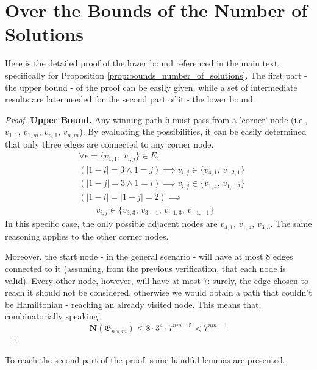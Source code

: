 \documentclass[conference]{IEEEtran}
\begin{document}



\newpage
\appendices
\section{Over the Bounds of the Number of Solutions} 	\label{appendix:proof_bound}
Here is the detailed proof of the lower bound referenced in the main text, specifically for Proposition \ref{prop:bounds_number_of_solutions}.
The first part - the upper bound - of the proof can be easily given, while a set of intermediate results are later needed for the second part of it - the lower bound.
\vspace{0.6em}
\begin{proof}
	\textbf{Upper Bound.} 
	Any winning path $\mathfrak{h}$ must pass from a 'corner' node (i.e., $v_{1,1},\,v_{1,m},\,v_{n,1},\,v_{n,m}$). By evaluating the possibilities, it can be easily determined that only three edges are connected to any corner node.
	\begin{align*}
		&\forall e = \{v_{1,1},\;v_{i,j}\} \in E, \\
		&(|1 - i| = 3 \land 1 = j) \implies v_{i,j} \in \{v_{4,1},\,v_{-2,1}\} \\
		&(|1 - j| = 3 \land 1 = i) \implies v_{i,j} \in \{v_{1,4},\,v_{1,-2}\} \\
		&(|1 - i| = |1 - j| = 2) \implies \\
		&\quad\quad v_{i,j} \in \{v_{3,3},\,v_{3,-1},\,v_{-1,3},\,v_{-1,-1}\}
	\end{align*}
	In this specific case, the only possible adjacent nodes are $v_{4,1},\,v_{1,4},\,v_{3,3}$. The same reasoning applies to the other corner nodes.
	
	Moreover, the start node - in the general scenario - will have at most $8$ edges connected to it (assuming, from the previous verification, that each node is valid). Every other node, however, will have at most $7$: surely, the edge chosen to reach it should not be considered, otherwise we would obtain a path that couldn't be Hamiltonian - reaching an already visited node.
	This means that, combinatorially speaking:
	$$
	\mathbf{N}(\mathfrak{G}_{n \times m}) \leq 8 \cdot 3^4 \cdot 7^{nm - 5} < 7^{nm - 1}
	$$
\end{proof}

To reach the second part of the proof, some handful lemmas are presented.
\end{document}
